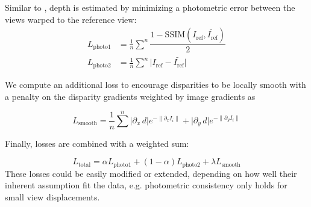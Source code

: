 Similar to \citep{dtam_Newcombe2011, monodepth17, superdepth18}, depth is estimated by minimizing a photometric error between the views warped to the reference view:
\begin{align}
	\label{eq:multiview:loss photometric1}
	L_{\text{photo1}} &= \frac{1}{n} \sum\limits^{n} \dfrac{1 - \text{SSIM}(I_{\text{ref}}, \tilde{I_{\text{ref}}})}{2}
	\\
	\label{eq:multiview:loss photometric2}
	L_{\text{photo2}} &= \frac{1}{n} \sum\limits^{n} \lvert I_{\text{ref}} - \tilde{I_{\text{ref}}}\rvert
\end{align}

We compute an additional loss to encourage disparities to be locally smooth with a penalty on the disparity gradients weighted by image gradients as 

\begin{equation}
	\label{eq:multiview:loss smoothness}	
	L_{\text{smooth}} = \frac{1}{n} \sum\limits^{n} \lvert \partial_{x} \, d \rvert e^{- \| \partial_{x} I_{i} \|} + \lvert \partial_{y} \, d \rvert e^{- \| \partial_{y} I_{i} \|}
\end{equation}

Finally, losses are combined with a weighted sum:

\begin{equation}
   	\label{eq:multiview:loss total}
	L_{\text{total}} = \alpha L_{\text{photo1}} + (1 - \alpha) L_{\text{photo2}} + \lambda L_{\text{smooth}} 
\end{equation}
These losses could be easily modified or extended, depending on how well their inherent  assumption fit the data, e.g. photometric consistency only holds for small view displacements.


